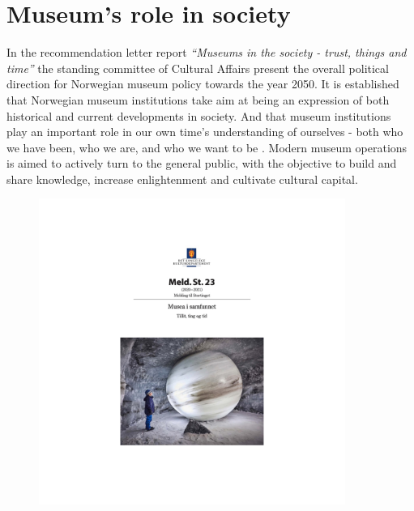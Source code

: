 
\section{Museum's role in society}
In the recommendation letter report \emph{“Museums in the society - trust, things and time”} the standing committee of Cultural Affairs present the overall political direction for Norwegian museum policy towards the year 2050. It is established that Norwegian museum institutions take aim at being an expression of both historical and current developments in society. And that museum institutions play an important role in our own time’s understanding of ourselves - both who we have been, who we are, and who we want to be \autocite[p. 7]{melding23}. Modern museum operations is aimed to actively turn to the general public, with the objective to build and share knowledge, increase enlightenment and cultivate cultural capital.

\begin{figure}[h]
\includegraphics[width=10cm]{pictures/stortingsmelding.jpg}
\centering 
\end{figure}

